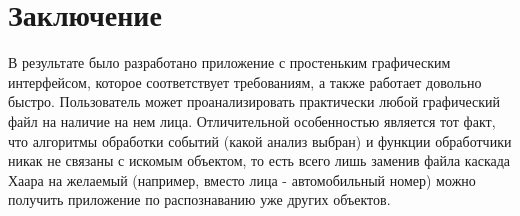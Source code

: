 \documentclass[a4paper,12pt]{article}
\begin{document}
\newpage

\section*{Заключение}

В результате было разработано приложение с простеньким графическим интерфейсом, которое соответствует требованиям, а также работает довольно быстро. Пользователь может проанализировать практически любой графический файл на наличие на нем лица. Отличительной особенностью является тот факт, что алгоритмы обработки событий (какой анализ выбран) и функции обработчики никак не связаны с искомым объектом, то есть всего лишь заменив файла каскада Хаара на желаемый (например, вместо лица - автомобильный номер) можно получить приложение по распознаванию уже других объектов.
\end{document}
